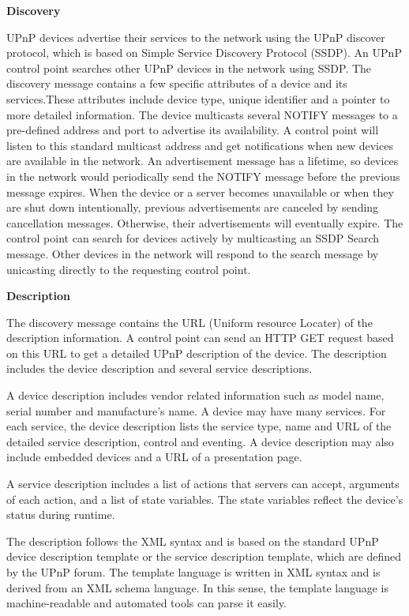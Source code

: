 \textbf{Discovery} 

UPnP devices advertise their services to the network using the UPnP discover protocol, which is based on 
Simple Service Discovery Protocol (SSDP). An UPnP control point searches other UPnP devices in the network using SSDP. The discovery message contains a few specific attributes 
of a device and its services.These attributes include device type, unique identifier and a 
pointer to more detailed information. The device multicasts several NOTIFY
messages to a pre-defined address and port to advertise its availability. A control point will listen to this standard multicast address and get 
notifications when new devices are available in the network. 
An advertisement message has a lifetime, so devices in the network would periodically send 
the NOTIFY message before the previous message expires. When the device or a server becomes unavailable or when they are shut down intentionally, previous advertisements are canceled by sending cancellation messages. Otherwise, their advertisements will eventually expire. 
The control point can search for devices actively by multicasting an SSDP Search message. Other devices 
in the network will respond to the search message by unicasting directly to the
requesting control point.

\textbf{Description}

The discovery message contains the URL (Uniform resource Locater) of the
description information. A control point can send an HTTP GET request based on
this URL to get a detailed UPnP description of the device. The description includes the device description and several service descriptions. 

A device description includes vendor related information such as model name,
 serial number and manufacture's name. A device may have many services. For each
 service, the device description lists the service type, name and URL of the detailed service description, control and eventing. A device 
description may also include embedded devices and a URL of a presentation
page.

A service description includes a list of actions that servers can accept, arguments of each action, 
and a list of state variables. The state variables reflect the device's status
during runtime.

The description follows the XML syntax and is based on the standard UPnP device
description template or the service description template, which are defined by
the UPnP forum. The template language is written in XML syntax and is derived from an XML schema language. In this sense, the template language is machine-readable and automated tools can parse it easily.

